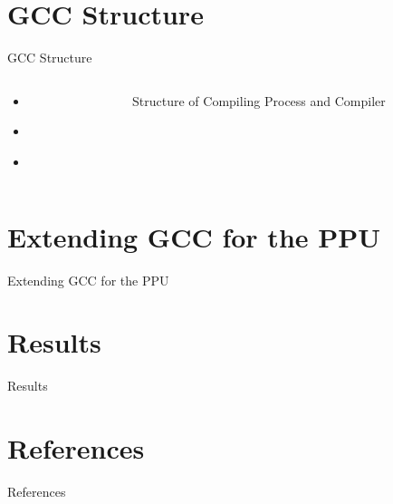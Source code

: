 \documentclass[10pt,aspectratio=169]{beamer}
\begin{document}
\section{GCC Structure}
\begin{frame}[fragile]{GCC Structure}
    \begin{columns}[c]
    \begin{column}{0.5\textwidth}
        \begin{itemize}
            \item \begin{center}\end{center}
            \item \begin{center}\end{center}
            \item \begin{center}\end{center}
        \end{itemize}
    \end{column}

    \begin{column}{0.5\textwidth}
        \centering
        \begin{figure}
            \begin{adjustbox}{center, max width={.5\columnwidth}}
                
                
            \end{adjustbox}
            \caption{\label{fig:compiler} Structure of Compiling Process and Compiler}
        \end{figure}
    \end{column}
    \end{columns}
\end{frame}



\section{Extending GCC for the PPU}
\begin{frame}{Extending GCC for the PPU}
 \begin{center}
 \end{center}
\end{frame}

\section{Results}
\begin{frame}{Results}
 \begin{center}
 \end{center}
\end{frame}



\section{References}
\begin{frame}{References}
    \printbibliography
\end{frame}
\end{document}
